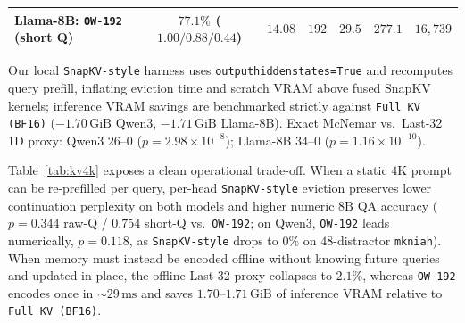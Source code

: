 \documentclass[11pt]{article}
\renewcommand{\_}{\origunderscore\allowbreak}
\begin{document}
\begin{table}[t]
{\begin{tabular}{@{}lcccccc@{}}
\textbf{Llama-8B:} \texttt{OW-192} (short Q) & $77.1\%$ ($1.00/0.88/0.44$) & $14.08$ & $192$ & $29.5$ & $277.1$ & $16{,}739$ \\
\bottomrule
\end{tabular}%
}
\vspace{2pt}
\parbox{\textwidth}{\footnotesize *Our local \texttt{SnapKV-style} harness uses \texttt{output\_hidden\_states=True} and recomputes query prefill, inflating eviction time and scratch VRAM above fused SnapKV kernels; inference VRAM savings are benchmarked strictly against \texttt{Full KV (BF16)} ($-1.70\,\text{GiB}$ Qwen3, $-1.71\,\text{GiB}$ Llama-8B). Exact McNemar vs.\ Last-32 1D proxy: Qwen3 $26$--$0$ ($p=2.98\times 10^{-8}$); Llama-8B $34$--$0$ ($p=1.16\times 10^{-10}$).}
\end{table}

Table~\ref{tab:kv4k} exposes a clean operational trade-off. When a static $4\text{K}$ prompt can be re-prefilled per query, per-head \texttt{SnapKV-style} eviction preserves lower continuation perplexity on both models and higher numeric $8\text{B}$ QA accuracy ($p=0.344$ raw-Q / $0.754$ short-Q vs.\ \texttt{OW-192}; on Qwen3, \texttt{OW-192} leads numerically, $p=0.118$, as \texttt{SnapKV-style} drops to $0\%$ on $48$-distractor \texttt{mk\_niah}). When memory must instead be encoded offline without knowing future queries and updated in place, the offline Last-32 proxy collapses to $2.1\%$, whereas \texttt{OW-192} encodes once in $\sim 29\,\text{ms}$ and saves $1.70$--$1.71\,\text{GiB}$ of inference VRAM relative to \texttt{Full KV (BF16)}.
\end{document}
